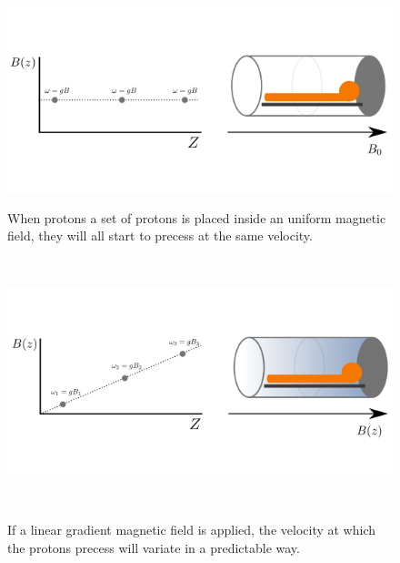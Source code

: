 \begin{figure}[h!]
\begin{minipage}[b]{0.49\textwidth}
    \includegraphics[width=\textwidth]{2.background/mri/img/grad0.png}
    \caption{\small  When protons a set of protons is placed inside an uniform magnetic field, they will all start to precess at the same velocity.}
     \label{fig:unif}
\end{minipage} ~
\hfill
\begin{minipage}[b]{0.49\textwidth}
    \includegraphics[width=\textwidth]{2.background/mri/img/grad1.png}
    \caption{\small If a linear gradient magnetic field is applied, the velocity at which the protons precess will variate in a predictable way.}
    \label{fig:grad}
\end{minipage} ~

\end{figure}

